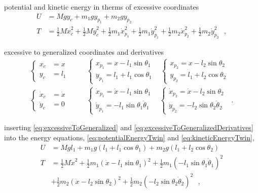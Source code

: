 potential and kinetic energy in therms of excessive coordinates
\begin{align}
  U &= M g y_c + m_1 g y_{p_1} + m_2 g y_{p_2}  \label{eq:potentialEnergyTwin}  \\
  T &= \tfrac{1}{2} M \dot{x}_c^2 + \tfrac{1}{2} M \dot{y}_c^2 + \tfrac{1}{2} m_1 \dot{x}_{p_1}^2  + \tfrac{1}{2} m_1 \dot{y}_{p_1}^2 + \tfrac{1}{2} m_2 \dot{x}_{p_2}^2 + \tfrac{1}{2} m_2 \dot{y}_{p_2}^2 \label{eq:kineticEnergyTwin} \ \ \ ,
\end{align}

excessive to generalized coordinates and derivatives
\begin{align}
  \begin{cases}
    x_c &=  x  \\
    y_c &=  l_1  
  \end{cases} &
  \hspace{20pt}
  \begin{cases}
    x_{p_1} =  x   - l_1 \sin \theta_1 \\
    y_{p_1} =  l_1 + l_1 \cos \theta_1
  \end{cases}
  \hspace{10pt}
  \begin{cases}
    x_{p_2} =  x   - l_2 \sin \theta_2 \\
    y_{p_2} =  l_1 + l_2 \cos \theta_2
  \end{cases}
  \label{eq:excessiveToGeneralized} \\
  \begin{cases}
    \dot{x}_c &=  \dot{x}  \\
    \dot{y}_c &=  0  
  \end{cases} &
  \hspace{20pt}
  \begin{cases}
    \dot{x}_{p_1} =  \dot{x} - l_1 \sin \theta_1 \\
    \dot{y}_{p_1} =  -l_1 \sin \theta_1 \dot{\theta}_1
  \end{cases}
  \hspace{10pt}
  \begin{cases}
    \dot{x}_{p_2} = \dot{x} - l_2 \sin \theta_2 \\
    \dot{y}_{p_2} = -l_2 \sin \theta_2 \dot{\theta}_2
  \end{cases}  \ \ \ .
  \label{eq:excessiveToGeneralizedDerivatives}
\end{align}

inserting \autoref{eq:excessiveToGeneralized} and \ref{eq:excessiveToGeneralizedDerivatives} into the energy equations, \autoref{eq:potentialEnergyTwin} and \ref{eq:kineticEnergyTwin},
%
\begin{align}
  U &= M g l_1 + m_1 g (l_1 + l_1 \cos \theta_1) + m_2 g (l_1 + l_2 \cos \theta_2)  \label{eq:potentialEnergyTwinGeneralized}  \\
  T &= \tfrac{1}{2} M \dot{x}^2 + \tfrac{1}{2} m_1 (\dot{x} - l_1 \sin \theta_1)^2  + \tfrac{1}{2} m_1 (-l_1 \sin \theta_1 \dot{\theta}_1)^2  \\
    &+ \tfrac{1}{2} m_2 (\dot{x} - l_2 \sin \theta_2)^2 + \tfrac{1}{2} m_2 (-l_2 \sin \theta_2 \dot{\theta}_2)^2 \label{eq:kineticEnergyTwinGeneralized} \ \ \ ,
\end{align}

